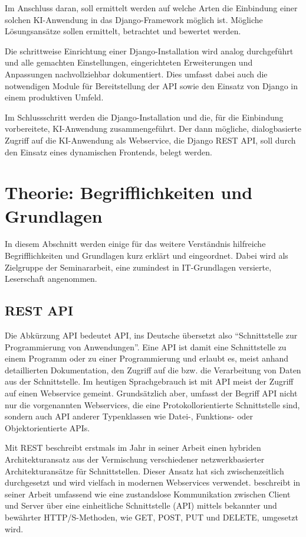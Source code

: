 \documentclass[12pt,oneside,titlepage,listof=totoc,bibliography=totoc]{scrartcl}
\begin{document}
Im Anschluss daran, soll ermittelt werden auf welche Arten die Einbindung einer solchen KI-Anwendung in das Django-Framework möglich ist. Mögliche Lösungsansätze sollen ermittelt, betrachtet und bewertet werden. 

Die schrittweise Einrichtung einer Django-Installation wird analog durchgeführt und alle gemachten Einstellungen, eingerichteten Erweiterungen und Anpassungen nachvollziehbar dokumentiert. Dies umfasst dabei auch die notwendigen Module für Bereitstellung der API sowie den Einsatz von Django in einem produktiven Umfeld. 

Im Schlussschritt werden die Django-Installation und die, für die Einbindung vorbereitete, KI-Anwendung zusammengeführt. Der dann mögliche, dialogbasierte Zugriff auf die KI-Anwendung als Webservice, die Django REST API, soll durch den Einsatz eines dynamischen Frontends, belegt werden. 


\newpage
\section{Theorie: Begrifflichkeiten und Grundlagen}

In diesem Abschnitt werden einige für das weitere Verständnis hilfreiche Begrifflichkeiten und Grundlagen kurz erklärt und eingeordnet. Dabei wird als Zielgruppe der Seminararbeit, eine zumindest in IT-Grundlagen versierte, Leserschaft angenommen.


\subsection{REST API}

Die Abkürzung \acs{API} bedeutet \acl{API}, ins Deutsche übersetzt also \enquote{Schnittstelle zur Programmierung von Anwendungen}. Eine API ist damit eine Schnittstelle zu einem Programm oder zu einer Programmierung und erlaubt es, meist anhand detaillierten Dokumentation, den Zugriff auf die  bzw. die Verarbeitung von Daten aus der Schnittstelle. Im heutigen Sprachgebrauch ist mit API  meist der Zugriff auf einen Webservice gemeint. Grundsätzlich aber, umfasst der Begriff API nicht nur die vorgenannten Webservices, die eine Protokollorientierte Schnittstelle sind, sondern auch API anderer Typenklassen wie Datei-, Funktions- oder Objektorientierte APIs.

Mit \ac{REST} beschreibt \citeauthor[]{51-fielding-rest} erstmals im Jahr \citeyear[]{51-fielding-rest} in seiner Arbeit  einen hybriden Architekturansatz aus der Vermischung verschiedener netzwerkbasierter Architekturansätze für Schnittstellen. Dieser Ansatz hat sich zwischenzeitlich durchgesetzt und wird vielfach in modernen Webservices verwendet. \citeauthor[]{51-fielding-rest} beschreibt in seiner Arbeit umfassend wie eine zustandslose Kommunikation zwischen Client und Server über eine einheitliche Schnittstelle (API) mittels bekannter und bewährter \ac{HTTP/S}-Methoden, wie GET, POST, PUT und DELETE, umgesetzt wird.
\end{document}
